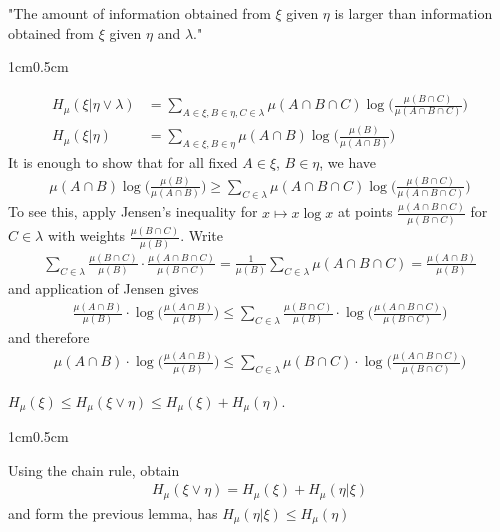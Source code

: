 \documentclass[12pt,a4paper]{report}
\newenvironment{proof}
{\begin{changemargin}{1cm}{0.5cm} 
	}%
	{\end{changemargin}
}
\begin{document}
"The amount of information obtained from $\xi$ given $\eta$ is larger than information obtained from $\xi$ given $\eta$ and $\lambda$."
\begin{proof}
\pf 
\begin{align*}
H_{\mu}(\xi | \eta \vee \lambda) &= \sum_{A \in \xi, B \in \eta, C \in \lambda} \mu(A\cap B \cap C) \log \Big( \frac{\mu(B\cap C)}{\mu(A\cap B \cap C)}\Big) \\
H_{\mu}(\xi | \eta ) &= \sum_{A \in \xi, B \in \eta} \mu(A\cap B ) \log \Big( \frac{\mu(B)}{\mu(A\cap B )}\Big)
\end{align*}
It is enough to show that for all fixed $A \in \xi$, $B\in \eta$, we have
\begin{align*}
\mu(A\cap B) \log \Big( \frac{\mu(B)}{\mu(A\cap B)}\Big) \geq \sum_{C \in \lambda} \mu(A \cap B \cap C) \log \Big( \frac{\mu(B\cap C)}{\mu(A\cap B \cap C)} \Big)
\end{align*}
To see this, apply Jensen's inequality for $x\mapsto x\log x$ at points $\frac{\mu(A\cap B\cap C)}{\mu(B \cap C)}$ for $C \in \lambda$ with weights $\frac{\mu(B\cap C)}{\mu(B)}$. Write
\begin{align*}
\sum_{C\in \lambda } \frac{\mu(B\cap C)}{\mu(B)} \cdot \frac{\mu(A\cap B \cap C)}{\mu(B\cap C)} = \frac{1}{\mu(B)} \sum_{C\in \lambda} \mu(A\cap B \cap C) = \frac{\mu(A\cap B)}{\mu(B)}
\end{align*}
and application of Jensen gives
\begin{align*}
\frac{\mu(A\cap B)}{\mu(B)}\cdot \log \Big( \frac{\mu(A\cap B)}{\mu(B)} \Big) \leq \sum_{C\in \lambda} \frac{\mu(B\cap C)}{\mu(B)} \cdot \log\Big( \frac{\mu(A\cap B \cap C)}{\mu(B\cap C)} \Big)
\end{align*}
and therefore
\begin{align*}
\mu(A\cap B)\cdot \log \Big( \frac{\mu(A\cap B)}{\mu(B)} \Big) \leq \sum_{C\in \lambda} \mu(B\cap C) \cdot \log \Big( \frac{\mu(A\cap B \cap C)}{\mu(B\cap C)} \Big)
\end{align*}

\eop
\end{proof}
\s

\cor $H_{\mu}(\xi) \leq H_{\mu}(\xi \vee \eta) \leq H_{\mu}(\xi) + H_{\mu}(\eta)$.
\begin{proof}
\pf Using the chain rule, obtain
\begin{align*}
H_{\mu}(\xi \vee \eta) = H_{\mu} (\xi)  + H_{\mu}(\eta | \xi)
\end{align*}
and form the previous lemma, has $H_{\mu}(\eta |\xi) \leq H_{\mu}(\eta)$

\eop
\end{proof}
\s
\end{document}
